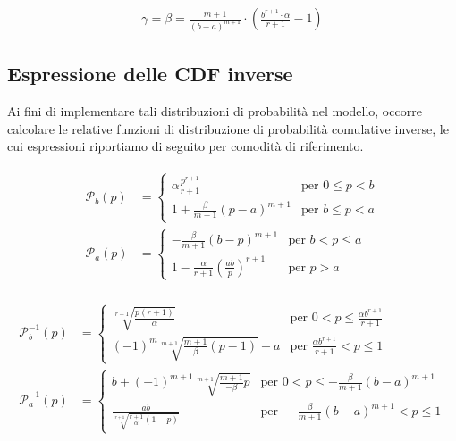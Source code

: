 \documentclass[paper=a4, fontsize=11pt]{scrartcl}
\numberwithin{equation}{section}
\numberwithin{figure}{section}
\numberwithin{table}{section}
\begin{document}
\begin{align}
\gamma = \beta = \frac{m+1}{(b-a)^{m+1}} \cdot  \left(\frac{b^{r+1}\cdot\alpha}{r+1}-1\right)
\end{align}

\subsection{Espressione delle CDF inverse}

Ai fini di implementare tali distribuzioni di probabilità nel modello, occorre calcolare le relative funzioni di distribuzione di probabilità comulative inverse, le cui espressioni riportiamo di seguito per comodità di riferimento.

\begin{align}
\begin{split}
\mathcal{P}_b(p) &= \left\{ \begin{array}{ll}
         \alpha \frac{p^{r+1}}{r+1}          & \text{per } 0 \leq p < b \\
         1 + \frac{\beta}{m+1} (p-a)^{m+1}   & \text{per } b \leq p < a 
         \end{array}\right. \\
\mathcal{P}_a(p) &= \left\{ \begin{array}{ll}
         -\frac{\beta}{m+1} (b - p)^{m+1}    & \text{per } b < p \leq a \\
         1-\frac{\alpha}{r+1}
         \left(\frac{ab}{p}\right)^{r+1}     & \text{per } p > a
         \end{array}\right.
\end{split}
\end{align}

\begin{align}
\begin{split}
\mathcal{P}^{-1}_b(p) &= \left\{ \begin{array}{ll}
         \sqrt[r+1]{\frac{p(r+1)}{\alpha}}   & \text{per } 0 < p \leq \frac{\alpha b^{r+1}}{r+1} \\
         (-1)^m \sqrt[m+1]{
         	\frac{m+1}{\beta}(p-1)} + a      & \text{per } \frac{\alpha b^{r+1}}{r+1} < p \leq 1 
         \end{array}\right. \\
\mathcal{P}^{-1}_a(p) &= \left\{ \begin{array}{ll}
         b + (-1)^{m+1} \sqrt[m+1]{
         	\frac{m+1}{-\beta} p}            & \text{per } 0 < p \leq - \frac{\beta}{m+1} (b-a)^{m+1} \\
         \frac{ab}{\sqrt[r+1]{
         	\frac{r+1}{\alpha}(1-p)}}        & \text{per } - \frac{\beta}{m+1} (b-a)^{m+1} < p \leq 1
         \end{array}\right.
\end{split}
\end{align}
\end{document}

